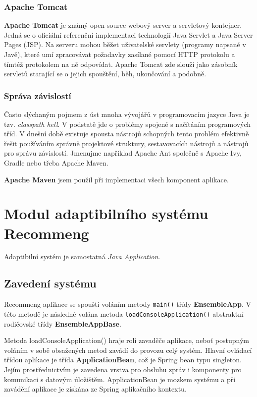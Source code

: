 \documentclass[thesis=M,czech]{FITthesis}[2014/05/07]
\begin{document}
\subsubsection{Apache Tomcat}
\textbf{Apache Tomcat} je známý open-source webový server a servletový kontejner. Jedná se o oficiální referenční implementaci technologií Java Servlet a Java Server Pages (JSP). Na serveru mohou běžet uživatelské servlety (programy napsané v Javě), které umí zpracovávat požadavky zasílané pomocí HTTP protokolu a tímtéž protokolem na ně odpovídat. Apache Tomcat zde slouží jako zásobník servletů starající se o jejich spouštění, běh, ukončování a podobně.

\subsubsection{Správa závislostí}
Často slýchaným pojmem z úst mnoha vývojářů v programovacím jazyce Java je tzv. \emph{classpath hell}. V podstatě jde o problémy spojené s načítáním programových tříd. V dnešní době existuje spousta nástrojů schopných tento problém efektivně řešit používáním správně projektové struktury, sestavovacích nástrojů a nástrojů pro správu závislostí. Jmenujme například Apache Ant společně s Apache Ivy, Gradle nebo třeba Apache Maven.

\textbf{Apache Maven} jsem použil při implementaci všech komponent aplikace.

\section{Modul adaptibilního systému Recommeng}
\label{sec:impl}

Adaptibilní systém je samostatná \emph{Java Application}.

\subsection{Zavedení systému}
Recommeng aplikace se spouští voláním metody \texttt{main()} třídy \textbf{EnsembleApp}. V této metodě je následně volána metoda \texttt{loadConsoleApplication()} abstraktní rodičovské třídy \textbf{EnsembleAppBase}.

Metoda loadConsoleApplication() hraje roli zavaděče aplikace, neboť postupným voláním v sobě obsažených metod zavádí do provozu celý systém. Hlavní ovládací třídou aplikace je třída \textbf{ApplicationBean}, což je Spring bean typu singleton. Jejím prostřednictvím je zavedena vrstva pro obsluhu zpráv i komponenty pro komunikaci s datovým úložištěm. ApplicationBean je mozkem systému a při zavádění aplikace je získána ze Spring aplikačního kontextu.
\end{document}
